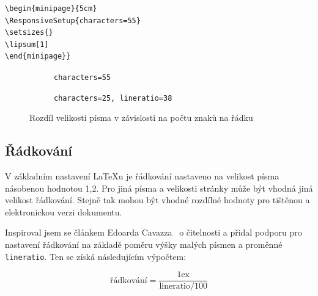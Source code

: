 \documentclass{csbulletin}
\begin{document}
\begin{verbatim}
\begin{minipage}{5cm}
\ResponsiveSetup{characters=55}
\setsizes{}
\lipsum[1]
\end{minipage}}
\end{verbatim}

\begin{figure}[tbp]
  \begin{subfigure}[t]{0.45\textwidth}
\caption{\texttt{characters=55}}
\end{subfigure}
\hfill
\begin{subfigure}[t]{0.45\textwidth}
\caption{\texttt{characters=25, lineratio=38}}
\end{subfigure}
  \caption{Rozdíl velikosti písma v závislosti na počtu znaků na řádku}\label{fig:fontsize}
\end{figure}

\subsection{Řádkování}

V základním nastavení \LaTeX u je řádkování nastaveno
na velikost písma násobenou hodnotou 1,2. Pro jiná 
písma a velikosti stránky může být vhodná jiná velikost řádkování.
Stejně tak mohou být vhodné rozdílné hodnoty pro tištěnou a elektronickou 
verzi dokumentu. 

Inspiroval jsem se článkem Edoarda Cavazza~\cite{cavazza} o čitelnosti
a přidal podporu pro nastavení řádkování na základě poměru výšky 
malých písmen a proměnné \texttt{lineratio}. Ten se získá následujícím 
výpočtem: 

\[\text{řádkování} = \frac{1\text{ex}}{\text{lineratio}/ 100}\]
\end{document}
